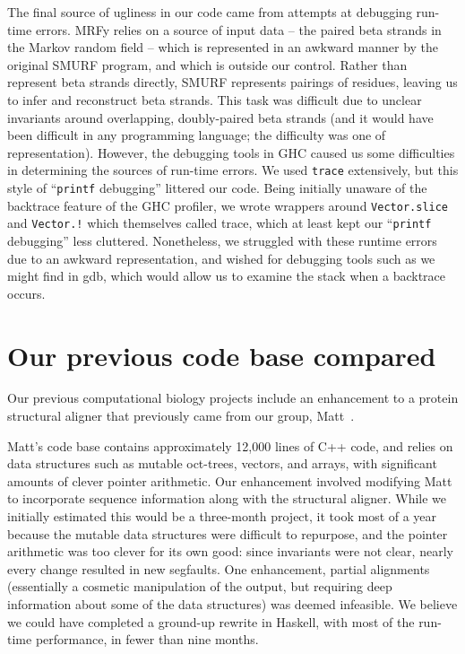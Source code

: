 \documentclass[preprint,nonatbib,blockstyle,nocopyrightspace,times]{sigplanconf}
\let\cite\citep
\begin{document}
The final source of ugliness in our code came from attempts at debugging 
run-time errors.
MRFy relies on a source of input data -- the paired beta 
strands in the Markov random field -- which is represented in an awkward manner 
by the original SMURF program, and which is outside our control.
Rather than 
represent beta strands directly, SMURF represents pairings of residues, leaving 
us to infer and reconstruct beta strands.
This task was difficult due to 
unclear invariants around overlapping, doubly-paired beta strands (and it would 
have been difficult in any programming language; the difficulty was one of 
representation).
However, the debugging tools in GHC caused us some 
difficulties in determining the sources of run-time errors.
We used 
\texttt{trace} extensively, but this style of ``\texttt{printf} debugging'' 
littered our code.
Being initially unaware of the backtrace feature of the GHC 
profiler, we wrote wrappers around \texttt{Vector.slice} and \texttt{Vector.!} 
which themselves called trace, which at least kept our ``\texttt{printf} 
debugging'' less cluttered.
Nonetheless, we struggled with these runtime errors 
due to an awkward representation, and wished for debugging tools such as we 
might find in gdb, which would allow us to examine the stack when a backtrace 
occurs.
 
 
\section{Our previous code base compared}

Our previous computational biology projects include an enhancement to a protein 
structural aligner that previously came from our group, Matt~\cite{matt}.

Matt's code base contains approximately 12,000 lines of C++ code, and relies on 
data structures such as mutable oct-trees, vectors, and arrays, with 
significant amounts of clever pointer arithmetic.
Our enhancement involved 
modifying Matt to incorporate sequence information along with the structural 
aligner.
While we initially estimated this would be a three-month project, it 
took most of a year because the mutable data structures were difficult to 
repurpose, and the pointer arithmetic was too clever for its own good: since 
invariants were not clear, nearly every change resulted in new segfaults.
One 
enhancement, partial alignments (essentially a cosmetic manipulation of the 
output, but requiring deep information about some of the data structures) was 
deemed infeasible.
We believe we could have completed a ground-up rewrite in 
Haskell, with most of the run-time performance, in fewer than nine months.
\end{document}
